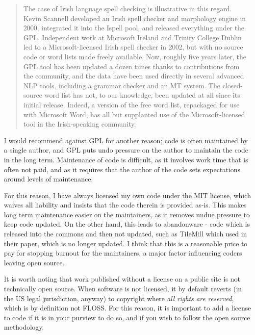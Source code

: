 \begin{quote}
The case of Irish language spell checking is illustrative in this regard. Kevin Scannell developed an Irish spell checker and morphology engine in 2000, integrated it into the Ispell pool, and released everything under the GPL. Independent work at Microsoft Ireland and Trinity College Dublin led to a Microsoft-licensed Irish spell checker in 2002, but with no source code or word lists made freely available. Now, roughly five years later, the GPL tool has been updated a dozen times thanks to contributions from the community, and the data have been used directly in several advanced NLP tools, including a grammar checker and an MT system. The closed-source word list has not, to our knowledge, been updated at all since its initial release. Indeed, a version of the free word list, repackaged for use with Microsoft Word, has all but supplanted use of the Microsoft-licensed tool in the Irish-speaking community. \citep[282-283]{streiter2006implementing}
\end{quote}

I would recommend against GPL for another reason; code is often maintained by a single author, and GPL puts undo pressure on the author to maintain the code in the long term. Maintenance of code is difficult, as it involves work time that is often not paid, and as it requires that the author of the code sets expectations around levels of maintenance.

For this reason, I have always licensed my own code under the MIT license, which waives all liability and insists that the code therein is provided as-is. This makes long term maintenance easier on the maintainers, as it removes undue pressure to keep code updated. On the other hand, this leads to abandonware - code which is released into the commons and then not updated, such as TileMill which \citet{gawne2016mapmaking} used in their paper, which is no longer updated. I think that this is a reasonable price to pay for stopping burnout for the maintainers, a major factor influencing coders leaving open source. %

It is worth noting that work published without a license on a public site is not technically open source. When software is not licensed, it by default reverts (in the US legal jurisdiction, anyway) to copyright where {\it all rights are reserved}, which is by definition not FLOSS. For this reason, it is important to add a license to code if it is in your purview to do so, and if you wish to follow the open source methodology.

